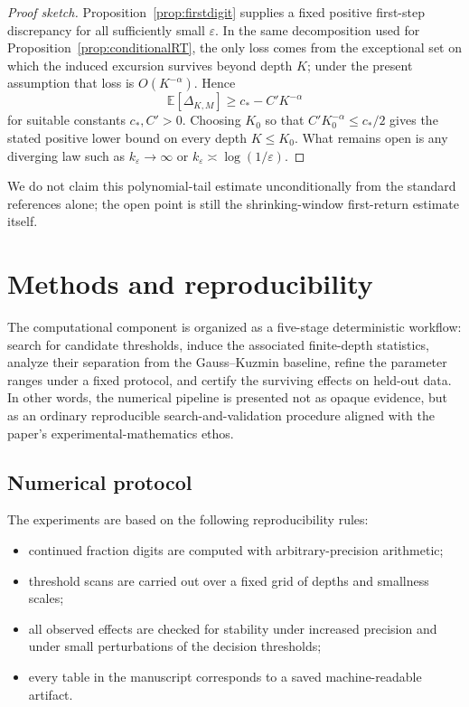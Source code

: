 \documentclass[11pt]{article}
\begin{document}
\begin{proof}[Proof sketch]
Proposition~\ref{prop:firstdigit} supplies a fixed positive first-step discrepancy for all sufficiently small $\varepsilon$. In the same decomposition used for Proposition~\ref{prop:conditionalRT}, the only loss comes from the exceptional set on which the induced excursion survives beyond depth $K$; under the present assumption that loss is $O(K^{-\alpha})$. Hence
\[
\mathbb{E}[\Delta_{K,M}]\ge c_*-C'K^{-\alpha}
\]
for suitable constants $c_*,C'>0$. Choosing $K_0$ so that $C'K_0^{-\alpha}\le c_*/2$ gives the stated positive lower bound on every depth $K\le K_0$. What remains open is any diverging law such as $k_{\varepsilon}\to\infty$ or $k_{\varepsilon}\asymp \log(1/\varepsilon)$.
\end{proof}

We do not claim this polynomial-tail estimate unconditionally from the standard references alone; the open point is still the shrinking-window first-return estimate itself.

\section{Methods and reproducibility}

The computational component is organized as a five-stage deterministic workflow: search for candidate thresholds, induce the associated finite-depth statistics, analyze their separation from the Gauss--Kuzmin baseline, refine the parameter ranges under a fixed protocol, and certify the surviving effects on held-out data. In other words, the numerical pipeline is presented not as opaque evidence, but as an ordinary reproducible search-and-validation procedure aligned with the paper's experimental-mathematics ethos.

\subsection{Numerical protocol}
The experiments are based on the following reproducibility rules:
\begin{itemize}
    \item continued fraction digits are computed with arbitrary-precision arithmetic;
    \item threshold scans are carried out over a fixed grid of depths and smallness scales;
    \item all observed effects are checked for stability under increased precision and under small perturbations of the decision thresholds;
    \item every table in the manuscript corresponds to a saved machine-readable artifact.
\end{itemize}
\end{document}
